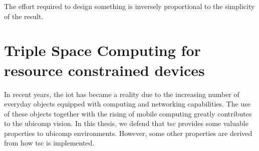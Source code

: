 

\begin{savequote}[50mm]
The effort required to design something is inversely proportional to the simplicity of the result.%
\end{savequote}


\newcommand{\codigo}[1]{``\texttt{#1}''}
\newcommand{\primquery}{\emph{query}}
\newcommand{\primread}{\emph{read}}
\newcommand{\primtake}{\emph{take}}
\newcommand{\primwrite}{\emph{write}}


\chapter{Triple Space Computing for resource constrained devices}
\label{cha:tsc}
\newcommand{\pathchapthree}{3_tsc}

\ifpdf
    \graphicspath{{\pathchapthree/figures/PNG/}{\pathchapthree/figures/PDF/}{\pathchapthree/figures/}}
\else
    \graphicspath{{\pathchapthree/figures/EPS/}{\pathchapthree/figures/}}
\fi





In recent years, the \acf{iot} has became a reality due to the increasing number of everyday objects equipped with computing and networking capabilities.
The use of these objects together with the rising of mobile computing greatly contributes to the \ac{ubicomp} vision.
In this thesis, we defend that \acf{tsc} provides some valuable properties to \ac{ubicomp} environments. %
However, some other properties are derived from how \ac{tsc} is implemented. %


